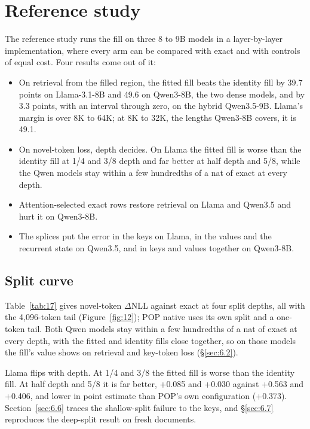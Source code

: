 \documentclass[11pt]{article}
\begin{document}
\section{Reference study}\label{sec:6}
The reference study runs the fill on three 8 to 9B models in a layer-by-layer implementation, where every arm can be compared with exact and with controls of equal cost. Four results come out of it:

\begin{itemize}[leftmargin=*,itemsep=2pt,topsep=4pt]
\item On retrieval from the filled region, the fitted fill beats the identity fill by 39.7 points on Llama-3.1-8B and 49.6 on Qwen3-8B, the two dense models, and by 3.3 points, with an interval through zero, on the hybrid Qwen3.5-9B. Llama's margin is over 8K to 64K; at 8K to 32K, the lengths Qwen3-8B covers, it is 49.1.
\item On novel-token loss, depth decides. On Llama the fitted fill is worse than the identity fill at 1/4 and 3/8 depth and far better at half depth and 5/8, while the Qwen models stay within a few hundredths of a nat of exact at every depth.
\item Attention-selected exact rows restore retrieval on Llama and Qwen3.5 and hurt it on Qwen3-8B.
\item The splices put the error in the keys on Llama, in the values and the recurrent state on Qwen3.5, and in keys and values together on Qwen3-8B.
\end{itemize}


\subsection{Split curve}\label{sec:6.1}
Table~\ref{tab:17} gives novel-token $\Delta$NLL against exact at four split depths, all with the 4,096-token tail (Figure~\ref{fig:12}); POP native uses its own split and a one-token tail. Both Qwen models stay within a few hundredths of a nat of exact at every depth, with the fitted and identity fills close together, so on those models the fill's value shows on retrieval and key-token loss (\S\ref{sec:6.2}).

Llama flips with depth. At 1/4 and 3/8 the fitted fill is worse than the identity fill. At half depth and 5/8 it is far better, +0.085 and +0.030 against +0.563 and +0.406, and lower in point estimate than POP's own configuration (+0.373). Section~\ref{sec:6.6} traces the shallow-split failure to the keys, and \S\ref{sec:6.7} reproduces the deep-split result on fresh documents.
\end{document}

